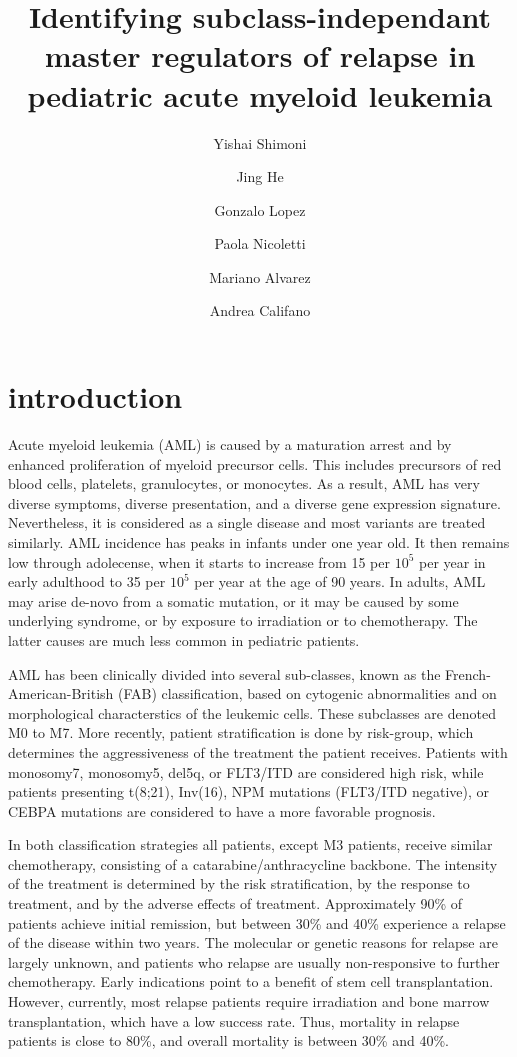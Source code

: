 \documentclass[10pt, letterpaper, twoside, english]{article}
\begin{document}

\title{Identifying subclass-independant master regulators of relapse in pediatric acute myeloid leukemia}
\author{Yishai Shimoni \and Jing He \and Gonzalo Lopez \and Paola Nicoletti \and Mariano Alvarez \and Andrea Califano}
\maketitle


\section{introduction}
Acute myeloid leukemia (AML) is caused by a maturation arrest 
and by enhanced proliferation of myeloid precursor cells. 
This includes precursors of red blood cells, platelets, granulocytes, or monocytes.
As a result, AML has very diverse symptoms, diverse presentation,
and a diverse gene expression signature. 
Nevertheless, it is considered as a single disease and most variants are treated similarly.
AML incidence has peaks in infants under one year old. 
It then remains low through adolecense, when it starts to increase 
from 15 per $10^5$ per year in early adulthood
to 35 per $10^5$ per year at the age of 90 years.
In adults, AML may arise de-novo from a somatic mutation, 
or it may be caused by some underlying syndrome, 
or by exposure to irradiation or to chemotherapy.
The latter causes are much less common in pediatric patients.

AML has been clinically divided into several sub-classes, 
known as the French-American-British (FAB) classification,
based on cytogenic abnormalities and on morphological characterstics of the leukemic cells.
These subclasses are denoted M0 to M7.
More recently, patient stratification is done by risk-group, 
which determines the aggressiveness of the treatment the patient receives.
Patients with monosomy7, monosomy5, del5q, or FLT3/ITD are considered high risk,
while patients presenting t(8;21), Inv(16), NPM mutations (FLT3/ITD negative), or CEBPA mutations
are considered to have a more favorable prognosis.

In both classification strategies all patients, except M3 patients, 
receive similar chemotherapy,
consisting of a catarabine/anthracycline backbone. 
The intensity of the treatment is determined by the risk stratification,
by the response to treatment, and by the adverse effects of treatment.
Approximately 90\% of patients achieve initial remission,
but between 30\% and 40\% experience a relapse of the disease within two years.
The molecular or genetic reasons for relapse are largely unknown, 
and patients who relapse are usually non-responsive to further chemotherapy.
Early indications point to a benefit of stem cell transplantation.
However, currently, most relapse patients require irradiation and bone marrow transplantation,
which have a low success rate.
Thus, mortality in relapse patients is close to 80\%, 
and overall mortality is between 30\% and 40\%.
\end{document}
